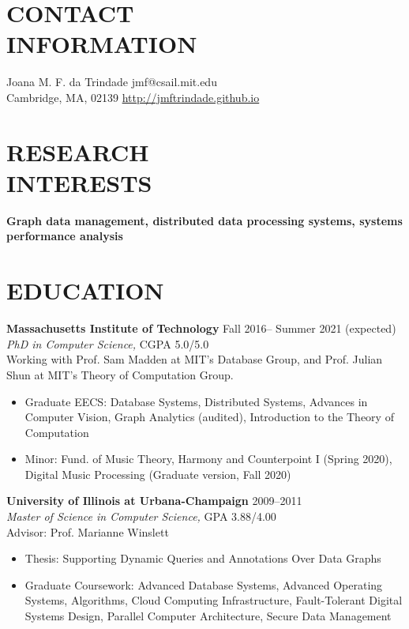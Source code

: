 \documentclass[line,margin]{res}
\begin{document}

\begin{resume}

\section{CONTACT \\ INFORMATION}  Joana M. F. da Trindade \hfill jmf@csail.mit.edu \\
  Cambridge, MA, 02139 \hfill \url{http://jmftrindade.github.io}

\section{RESEARCH \\ INTERESTS} \textbf{Graph data management, distributed data processing systems, systems performance analysis}

\section{EDUCATION} \textbf{Massachusetts Institute of Technology} \hfill Fall 2016-- Summer 2021 (expected) \\
  {\sl PhD in Computer Science,} CGPA 5.0/5.0 \\
  Working with Prof. Sam Madden at MIT's Database Group, and Prof. Julian Shun at MIT's Theory of Computation Group.
  \begin{itemize}  \itemsep -2pt
  \item Graduate EECS: Database Systems, Distributed Systems, Advances in Computer Vision, Graph Analytics (audited), Introduction to the Theory of Computation
  \item Minor: Fund. of Music Theory, Harmony and Counterpoint I (Spring 2020), Digital Music Processing (Graduate version, Fall 2020)
  \end{itemize}

  \textbf{University of Illinois at Urbana-Champaign} \hfill 2009--2011 \\
  {\sl Master of Science in Computer Science,}  GPA 3.88/4.00 \\
  Advisor: Prof. Marianne Winslett
  \begin{itemize}  \itemsep -2pt
  \item Thesis: Supporting Dynamic Queries and Annotations Over Data Graphs
  \item Graduate Coursework: Advanced Database Systems, Advanced Operating Systems, Algorithms, Cloud Computing Infrastructure, Fault-Tolerant Digital Systems Design, Parallel Computer Architecture, Secure Data Management
  \end{itemize}


\end{resume}
\end{document}
